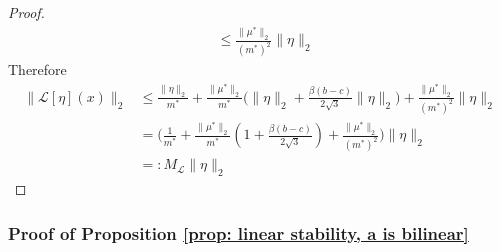 \documentclass[10pt]{article}
\begin{document}
\begin{proof}
\begin{align*}
&\leq \frac{\|\mu^*\|_2}{(m^*)^2} \|\eta\|_2
\end{align*}
Therefore
\begin{align*}
    \bigg\|\mathcal{L}[\eta](x)\bigg\|_2 &\leq  \frac{\|\eta\|_2}{m^*} +  \frac{\|\mu^*\|_2}{m^*}\Big(\|\eta\|_2 + \frac{\beta (b-c)}{2\sqrt{3}}\|\eta\|_2\Big)  + \frac{\|\mu^*\|_2}{(m^*)^2} \|\eta\|_2\\
    &= \bigg(\frac{1}{m^*} +\frac{\|\mu^*\|_2}{m^*}(1 + \frac{\beta (b-c)}{2\sqrt{3}}) +  \frac{\|\mu^*\|_2}{(m^*)^2}\bigg) \|\eta\|_2 \\
    &=: M_\mathcal{L} \|\eta\|_2
\end{align*}
\end{proof}

\subsubsection*{Proof of Proposition \ref{prop: linear stability, a is bilinear}}
\end{document}
